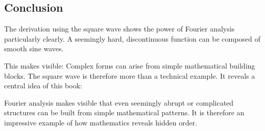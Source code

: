 \subsection{Conclusion}

The derivation using the square wave shows the power of Fourier analysis particularly clearly.
A seemingly hard, discontinuous function can be composed of smooth sine waves.

This makes visible:
Complex forms can arise from simple mathematical building blocks.
The square wave is therefore more than a technical example.
It reveals a central idea of this book:

\begin{NoteBox}
	\small
	\label{box:anhangA-fourier-ordnung-form}
	Fourier analysis makes visible
	that even seemingly abrupt or complicated structures
	can be built from simple mathematical patterns.
	It is therefore an impressive example of how mathematics reveals hidden order.
\end{NoteBox}
